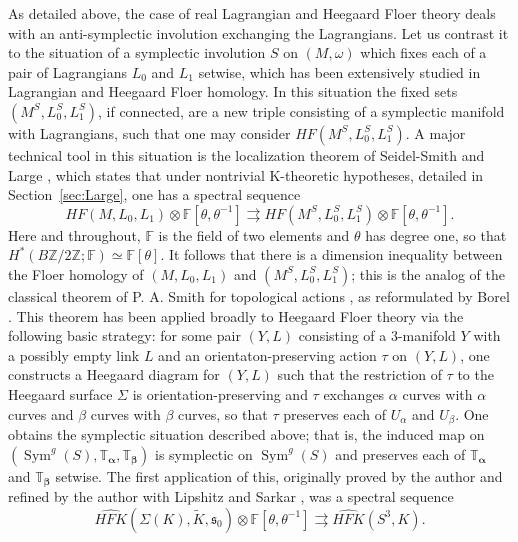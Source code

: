 \documentclass[11pt,reqno]{amsart}
\theoremstyle{definition}
\theoremstyle{remark}
\newcommand{\T}{\mathbb{T}}
\DeclareMathOperator{\Sym}{{Sym}}
\newcommand{\bF}{\mathbb{F}}
\newcommand{\bZ}{\mathbb{Z}}
\newcommand{\alphas}{\boldsymbol \alpha}
\newcommand{\betas}{\boldsymbol \beta}
\newcommand{\HF}{\mathit{HF}}
\newcommand{\HFK}{\mathit{HFK}}
\newcommand\HFKhat{\widehat{\HFK}}
\numberwithin{equation}{section}
\begin{document}
As detailed above, the case of real Lagrangian and Heegaard Floer theory deals with an anti-symplectic involution exchanging the Lagrangians. Let us contrast it to the situation of a symplectic involution $S$ on $(M, \omega)$ which fixes each of a pair of Lagrangians $L_0$ and $L_1$ setwise, which has been extensively studied in Lagrangian and Heegaard Floer homology. In this situation the fixed sets $(M^S, L_0^S, L_1^S)$, if connected, are a new triple consisting of a symplectic manifold with Lagrangians, such that one may consider $\HF(M^S, L_0^S, L_1^S)$. A major technical tool in this situation is the localization theorem of Seidel-Smith \cite{SS10} and Large \cite{Large}, which states that under nontrivial K-theoretic hypotheses, detailed in Section~\ref{sec:Large}, one has a spectral sequence
%
\[\HF(M, L_0, L_1) \otimes \bF[\theta, \theta^{-1}] \rightrightarrows \HF(M^S, L_0^S, L_1^S) \otimes \bF[\theta, \theta^{-1}]. \]
%
Here and throughout, $\bF$ is the field of two elements and $\theta$ has degree one, so that $H^*(B \bZ/2\bZ; \bF) \simeq \bF[\theta]$. It follows that there is a dimension inequality between the Floer homology of $(M, L_0, L_1)$ and $(M^S, L_0^S, L_1^S)$; this is the analog of the classical theorem of P. A. Smith for topological actions \cite{Smith:dimension}, as reformulated by Borel \cite{Borel:nouvelle}. This theorem has been applied broadly to Heegaard Floer theory via the following basic strategy: for some pair $(Y,L)$ consisting of a 3-manifold $Y$ with a possibly empty link $L$ and an orientaton-preserving action $\tau$ on $(Y,L)$, one constructs a Heegaard diagram for $(Y,L)$ such that the restriction of $\tau$ to the Heegaard surface $\Sigma$ is orientation-preserving and $\tau$ exchanges $\alpha$ curves with $\alpha$ curves and $\beta$ curves with $\beta$ curves, so that $\tau$ preserves each of $U_{\alpha}$ and $U_{\beta}$. One obtains the symplectic situation described above; that is, the induced map on $(\Sym^g(S), \T_{\alphas}, \T_{\betas})$ is symplectic on $\Sym^g(S)$ and preserves each of $\T_{\alphas}$ and $\T_{\betas}$ setwise. The first application of this, originally proved by the author \cite{Hendricks12:dcov-localization} and refined by the author  with Lipshitz and Sarkar \cite{HLS-equivariant}, was a spectral sequence
%
\begin{equation} \label{eqn:original}\HFKhat(\Sigma(K), \widetilde{K}, \mathfrak s_0) \otimes \bF[\theta, \theta^{-1}] \rightrightarrows \HFKhat(S^3,K).\end{equation}
%
\end{document}
